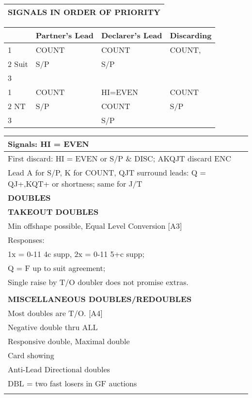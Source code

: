 \documentclass{article}
\begin{document}
\begin{minipage}{90mm}
\begin{tabular}{| p{88mm} |}
		\cellcolor{orange!25}\textbf{SIGNALS IN ORDER OF PRIORITY} \\ \hline
	\end{tabular}
	\begin{tabular}{| p{8.9mm} | p{22mm} | p{22mm} | p{22mm} |}
		& Partner's Lead & Declarer's Lead & Discarding \\ \hline
		1 & COUNT & COUNT & COUNT, \\ \hline
		2 Suit & S/P & S/P& \\ \hline
		3 & & & \\ \hline
		1 & COUNT & HI=EVEN & COUNT \\ \hline
		2 NT & S/P & COUNT & S/P \\ \hline
		3 & & S/P & \\ \hline
	\end{tabular}
	\begin{tabular}{| p{88mm} |}
		Signals: HI = EVEN\\ \hline
		First discard: HI = EVEN or S/P \& DISC; AKQJT discard ENC\\ \hline
		Lead A for S/P, K for COUNT, QJT surround leads: Q = QJ+,KQT+ or shortness; same for J/T \\ \hline %
		\cellcolor{green!25} \textbf{DOUBLES} \\ \hline
		\cellcolor{orange!25}\textbf{TAKEOUT DOUBLES} \\ \hline
		Min offshape possible, Equal Level Conversion [A3]\\ \hline
		Responses:\\ \hline
		1x = 0-11 4c supp, 2x = 0-11 5+c supp;\\ \hline
		Q = F up to suit agreement;\\ \hline
		Single raise by T/O doubler does not promise extras.\\ \hline
		\\ \hline
		\cellcolor{orange!25}\textbf{MISCELLANEOUS DOUBLES/REDOUBLES} \\ \hline
		Most doubles are T/O. [A4]\\ \hline
		Negative double thru ALL\\ \hline
		Responsive double, Maximal double\\ \hline
		Card showing\\ \hline
		Anti-Lead Directional doubles\\ \hline
		DBL = two fast losers in GF auctions\\ \hline
		\\ \hline
	\end{tabular}
\end{minipage}
\end{document}
